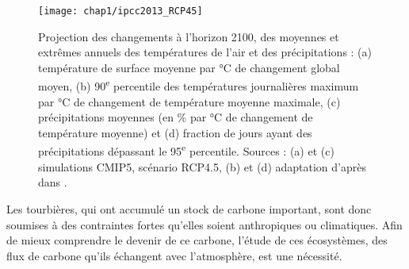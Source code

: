 


\begin{figure}
\centering
\texttt{[image: chap1/ipcc2013\_RCP45]}
\caption{Projection des changements à l'horizon 2100, des moyennes et extrêmes annuels des températures de l'air et des précipitations : (a) température de surface moyenne par \si{\degreeCelsius} de changement global moyen, (b) 90\textsuperscript{e} percentile des températures journalières maximum par \si{\degreeCelsius} de changement de température moyenne maximale, (c) précipitations moyennes (en \si{\percent} par \si{\degreeCelsius} de changement de température moyenne) et (d) fraction de jours ayant des précipitations dépassant le 95\textsuperscript{e} percentile. Sources : (a) et (c) simulations CMIP5, scénario RCP4.5, (b) et (d) adaptation d'après \citet{orlowsky2012} dans \cite{christensen2013}.}
\label{fig:ipcc2013_T_rain}
\end{figure}


Les tourbières, qui ont accumulé un stock de carbone important, sont donc soumises à des contraintes fortes qu'elles soient anthropiques ou climatiques.
Afin de mieux comprendre le devenir de ce carbone, l'étude de ces écosystèmes, des flux de carbone qu'ils échangent avec l'atmosphère, est une nécessité.


\singlespacing

